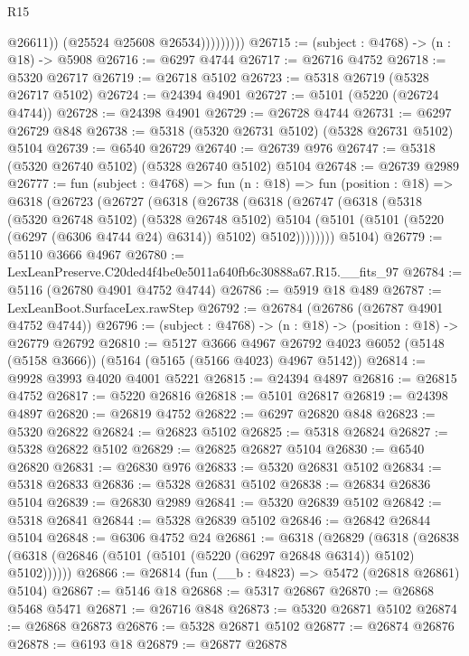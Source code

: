 \begin{lexlean}{R15}
\begin{coremodule}
{{{{{{{{{{{                        @26611))
                    (@25524 @25608 @26534)))))))))
@26715 := (subject : @4768) -> (n : @18) -> @5908
@26716 := @6297 @4744
@26717 := @26716 @4752
@26718 := @5320 @26717
@26719 := @26718 @5102
@26723 := @5318 @26719 (@5328 @26717 @5102)
@26724 := @24394 @4901
@26727 := @5101 (@5220 (@26724 @4744))
@26728 := @24398 @4901
@26729 := @26728 @4744
@26731 := @6297 @26729 @848
@26738 := @5318 (@5320 @26731 @5102) (@5328 @26731 @5102) @5104
@26739 := @6540 @26729
@26740 := @26739 @976
@26747 := @5318 (@5320 @26740 @5102) (@5328 @26740 @5102) @5104
@26748 := @26739 @2989
@26777 := fun (subject : @4768) =>
  fun (n : @18) =>
  fun (position : @18) =>
  @6318
    (@26723
      (@26727
        (@6318
          (@26738
            (@6318
              (@26747
                (@6318
                  (@5318
                    (@5320 @26748 @5102)
                    (@5328 @26748 @5102)
                    @5104
                    (@5101 (@5101 (@5220 (@6297 (@6306 @4744 @24) @6314)) @5102) @5102))))))))
      @5104)
@26779 := @5110 @3666 @4967
@26780 := LexLeanPreserve.C20ded4f4be0e5011a640fb6c30888a67.R15.__fits_97
@26784 := @5116 (@26780 @4901 @4752 @4744)
@26786 := @5919 @18 @489
@26787 := LexLeanBoot.SurfaceLex.rawStep
@26792 := @26784 (@26786 (@26787 @4901 @4752 @4744))
@26796 := (subject : @4768) -> (n : @18) -> (position : @18) -> @26779 @26792
@26810 := @5127
    @3666
    @4967
    @26792
    @4023
    @6052
    (@5148 (@5158 @3666))
    (@5164 (@5165 (@5166 @4023) @4967 @5142))
@26814 := @9928 @3993 @4020 @4001 @5221
@26815 := @24394 @4897
@26816 := @26815 @4752
@26817 := @5220 @26816
@26818 := @5101 @26817
@26819 := @24398 @4897
@26820 := @26819 @4752
@26822 := @6297 @26820 @848
@26823 := @5320 @26822
@26824 := @26823 @5102
@26825 := @5318 @26824
@26827 := @5328 @26822 @5102
@26829 := @26825 @26827 @5104
@26830 := @6540 @26820
@26831 := @26830 @976
@26833 := @5320 @26831 @5102
@26834 := @5318 @26833
@26836 := @5328 @26831 @5102
@26838 := @26834 @26836 @5104
@26839 := @26830 @2989
@26841 := @5320 @26839 @5102
@26842 := @5318 @26841
@26844 := @5328 @26839 @5102
@26846 := @26842 @26844 @5104
@26848 := @6306 @4752 @24
@26861 := @6318
    (@26829
      (@6318 (@26838 (@6318 (@26846 (@5101 (@5101 (@5220 (@6297 @26848 @6314)) @5102) @5102))))))
@26866 := @26814 (fun (__b : @4823) => @5472 (@26818 @26861) @5104)
@26867 := @5146 @18
@26868 := @5317 @26867
@26870 := @26868 @5468 @5471
@26871 := @26716 @848
@26873 := @5320 @26871 @5102
@26874 := @26868 @26873
@26876 := @5328 @26871 @5102
@26877 := @26874 @26876
@26878 := @6193 @18
@26879 := @26877 @26878
}}}}}}}}}}}
\end{coremodule}
\end{lexlean}
